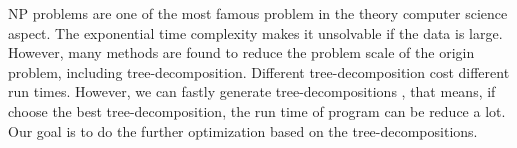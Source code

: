 NP problems are one of the most famous problem in the theory computer science aspect. The exponential time complexity makes it unsolvable if the data is large. However, many methods are found to reduce the problem scale of the origin problem, including tree-decomposition. Different tree-decomposition cost different run times. However, we can fastly generate tree-decompositions \cite{BHL1996LinearTreeDeomposition}, that means, if choose the best tree-decomposition, the run time of program can be reduce a lot. Our goal is to do the further optimization based on the tree-decompositions.